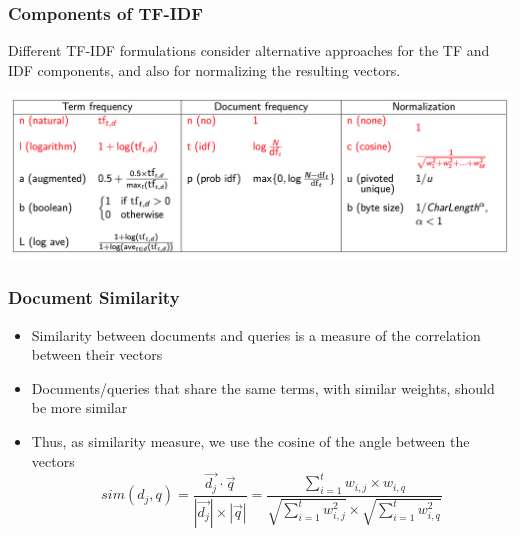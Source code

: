 \documentclass[svgnames]{beamer}
\begin{document}
\begin{frame}
  \frametitle{Components of TF-IDF}

  Different TF-IDF formulations consider alternative approaches for the TF and IDF components, and also for normalizing the resulting vectors.
  \begin{center}
    \includegraphics[width=.9\linewidth]{tfidf-variants.png}\\
  \end{center}

\end{frame}


\begin{frame} \frametitle{Document Similarity}

  \begin{block}{}
    \begin{itemize}
    \item Similarity between documents and queries is a measure of the
      correlation between their vectors
    \item Documents/queries that share the same terms, with similar weights,
      should be more similar
    \item Thus, as similarity measure, we use the \alert{cosine of the angle
        between the vectors}
      \begin{displaymath}
          sim(d_j,q) =
          \frac{\vec{d_j}\cdot\vec{q}}{|\vec{d_j}|\times|\vec{q}|} =
          \frac{\sum_{i=1}^{t}w_{i,j} \times w_{i,q}}
               {\sqrt{\sum_{i=1}^{t}w_{i,j}^2} \times \sqrt{\sum_{i=1}^{t}w_{i,q}^2}}
      \end{displaymath}
    \end{itemize}
  \end{block}
\end{frame}

\end{document}
